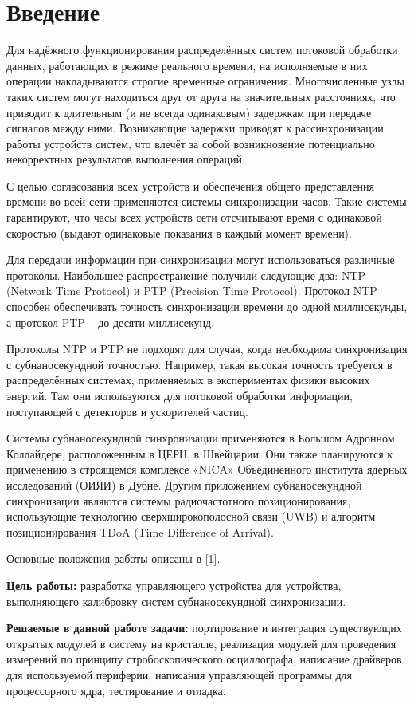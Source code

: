 \chapter*{Введение} %

Для надёжного функционирования распределённых систем потоковой обработки данных, работающих в
режиме реального времени, на исполняемые в них операции накладываются строгие временные ограничения.
Многочисленные узлы таких систем могут находиться друг от друга на значительных расстояниях, 
что приводит к длительным (и не всегда одинаковым) задержкам при передаче сигналов между ними.
Возникающие задержки приводят к рассинхронизации работы устройств систем, что влечёт за собой 
возникновение потенциально некорректных результатов выполнения операций. 

С целью согласования всех устройств и обеспечения общего представления времени во всей сети применяются 
системы синхронизации часов. Такие системы гарантируют, что часы всех устройств сети отсчитывают время с 
одинаковой скоростью (выдают одинаковые показания в каждый момент времени).

Для передачи информации при синхронизации могут использоваться различные протоколы.
Наибольшее распространение получили следующие два: NTP (Network Time Protocol) и PTP (Precision Time Protocol).
Протокол NTP способен обеспечивать точность синхронизации времени до одной миллисекунды, а протокол PTP – до десяти миллисекунд. 

Протоколы NTP и PTP не подходят для случая, когда необходима синхронизация с субнаносекундной точностью. Например, 
такая высокая точность требуется в распределённых системах, применяемых в экспериментах физики высоких энергий.
Там они используются для потоковой обработки информации, поступающей с детекторов и ускорителей частиц. 

Системы субнаносекундной синхронизации применяются в Большом Адронном Коллайдере, расположенным в ЦЕРН, в Швейцарии. Они также
планируются к применению в строящемся комплексе «NICA» Объединённого института ядерных исследований (ОИЯИ) в Дубне. 
Другим приложением субнаносекундной синхронизации являются системы радиочастотного позиционирования,
использующие технологию сверхширокополосной связи (UWB) и алгоритм позиционирования TDoA (Time Difference of Arrival).

Основные положения работы описаны в [1].

\textbf{Цель работы:} разработка управляющего устройства для устройства, выполняющего калибровку систем субнаносекундной синхронизации.

\textbf{Решаемые в данной работе задачи:} портирование и интеграция существующих открытых модулей в систему на кристалле, 
реализация модулей для проведения измерений по принципу стробоскопического осциллографа, написание драйверов для используемой периферии,
написания управляющей программы для процессорного ядра, тестирование и отладка.